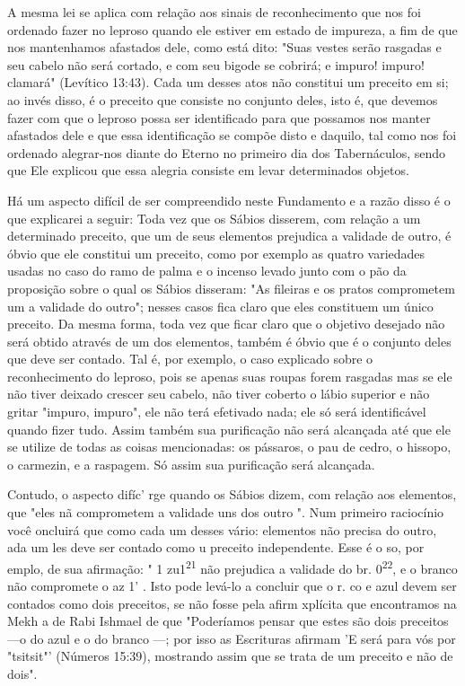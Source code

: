 \begin{itemize}
\begin{enumrate}
A mesma lei se aplica com relação aos sinais de reconhecimento que nos
foi ordenado fazer no leproso quando ele estiver em estado de impureza,
a fim de que nos mantenhamos afastados dele, como está dito: "Suas
vestes serão rasgadas e seu cabelo não será cortado, e com seu bigode se
cobrirá; e impuro! impuro! clamará" (Levítico 13:43). Cada um desses
atos não constitui um preceito em si; ao invés disso, é o preceito que
consiste no conjunto deles, isto é, que devemos 
fazer com que o leproso possa ser identificado para
que possamos nos manter afastados dele e que essa identificação se
compõe disto e daquilo, tal como nos foi ordenado alegrar-nos diante do
Eterno no primeiro dia dos Tabernáculos, sendo que Ele explicou que essa
alegria consiste em le­var determinados objetos.

Há um aspecto difícil de ser compreendido neste Fundamento e a razão
disso é o que explicarei a seguir: Toda vez que os Sábios disserem, com
relação a um determinado preceito, que um de seus elementos prejudica a
vali­dade de outro, é óbvio que ele constitui um preceito, como por
exemplo as quatro variedades usadas no caso do ramo de palma e o incenso
levado junto com o pão da proposição sobre o qual os Sábios disseram:
"As fileiras e os pra­tos comprometem um a validade do outro"; nesses
casos fica claro que eles constituem um único preceito. Da mesma forma,
toda vez que ficar claro que o objetivo desejado não será obtido através
de um dos elementos, também é óbvio que é o conjunto deles que deve ser
contado. Tal é, por exemplo, o caso explicado sobre o reconhecimento do
leproso, pois se apenas suas roupas fo­rem rasgadas mas se ele não tiver
deixado crescer seu cabelo, não tiver coberto o lábio superior e não
gritar "impuro, impuro", ele não terá efetivado nada; ele só será
identificável quando fizer tudo. Assim também sua purificação não será
alcançada até que ele se utilize de todas as coisas mencionadas: os
pássa­ros, o pau de cedro, o hissopo, o carmezin, e a raspagem. Só assim
sua purifica­ção será alcançada.

Contudo, o aspecto difíc' rge quando os Sábios dizem, com rela­ção aos
elementos, que "eles nã comprometem a validade uns dos outro ". Num
primeiro raciocínio você oncluirá que como cada um desses vário:
ele­mentos não precisa do outro, ada um les deve ser contado como u
pre­ceito independente. Esse é o so, por emplo, de sua afirmação: " 1
zu1\textsuperscript{21} não prejudica a validade do br.
0\textsuperscript{22}, e o branco não compromete o az 1' . Isto pode
levá-lo a concluir que o r. co e azul devem ser contados como dois
preceitos, se não fosse pela afirm xplícita que encontramos na Mekh a de
Rabi Ishmael de que "Poderíamos pensar que estes são dois preceitos ---o
do azul e o do branco ---; por isso as Escrituras afirmam 'E será para
vós por "tsitsit"' (Números 15:39), mostrando assim que se trata de um
preceito e não de dois".


\end{enumrate}
\end{itemize}

